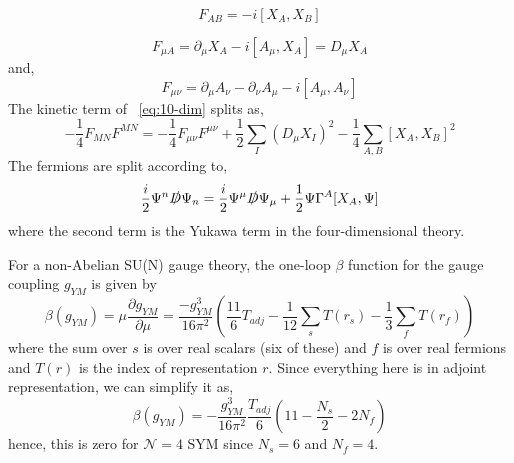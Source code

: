 \begin{equation}
F_{AB} = -i[X_{A}, X_{B}] 
\end{equation}

\begin{equation}
F_{\mu A} = \partial_{\mu} X_{A} -i [A_{\mu}, X_{A}]  = D_{\mu} X_{A} 
\end{equation}
and, 
\begin{equation}
F_{\mu \nu} = \partial_{\mu} A_{\nu} - \partial_{\nu} A_{\mu} -i [A_{\mu}, A_{\nu}] 
\end{equation}
The kinetic term of ~\ref{eq:10-dim} splits as, 
\begin{equation}
-\frac{1}{4} F_{MN}F^{MN} = -\frac{1}{4} F_{\mu\nu}F^{\mu\nu} + \frac{1}{2} \sum_{I} (D_{\mu} X_{I})^{2}   - \frac{1}{4} \sum_{A,B} [X_{A}, X_{B}]^{2} 
\end{equation}
The fermions are split according to, 
\begin{equation}
\frac{i}{2} \Psi^{n} \slashed{D} \Psi_{n} = \frac{i}{2} \Psi^{\mu} \slashed{D} \Psi_{\mu} + \frac{1}{2} \Psi \Gamma^{A}[X_{A}, \Psi] 
\end{equation}
where the second term is the Yukawa term in the four-dimensional theory. 

For a non-Abelian SU(N) gauge theory, the one-loop $\beta$ 
function for the gauge coupling $g_{YM}$ is given by \cite{Gross:1973ju, 2012LMaPh..99...33M}
 \begin{equation}
\beta(g_{YM}) = \mu \frac{\partial g_{YM}}{\partial \mu} = \frac{-g_{YM}^{3}}{16 \pi^{2}} \left ( \frac{11}{6}T_{adj} - \frac{1}{12} \sum_{s} T(r_{s}) - \frac{1}{3} \sum_{f} T(r_{f}) \right) 
\end{equation}
 where the sum over $s$ is over real scalars (six of these) and $f$ is over 
real fermions and $T(r)$ is the index of representation $r$. 
Since everything here is in adjoint representation, we can simplify it as, 
\begin{equation}
\beta(g_{YM}) = -\frac{g_{YM}^{3}}{16\pi^{2}}\frac{T_{adj}}{6}\left(11 - \frac{N_{s}}{2} - 2N_{f} \right) 
\end{equation}
hence, this is zero for $\mathcal{N} = 4 $ SYM since $N_{s} = 6$ and $N_{f} = 4$. 
 

